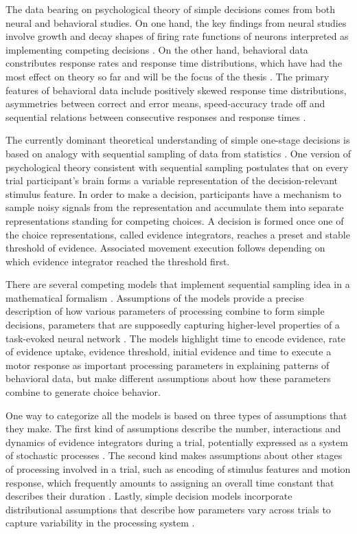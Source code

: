\documentclass[12pt]{report}
\begin{document}
The data bearing on psychological theory of simple decisions comes from both neural and behavioral studies. On one hand, the key findings from neural studies involve growth and decay shapes of firing rate functions of neurons interpreted as implementing competing decisions \citep{GolSha2007}. On the other hand, behavioral data constributes response rates and response time distributions, which have had the most effect on theory so far and will be the focus of the thesis \citep{Sto1960,Edw1965,Vic1979, TowAsh1983,Luc1986,ShaNew1996,RatRou1998,SmiRat2004,Bog2007,MulMaa2014}. The primary features of behavioral data include positively skewed response time distributions, asymmetries between correct and error means, speed-accuracy trade off and sequential relations between consecutive responses and response times \citep{CraPer2010,Rat2014}. 

The currently dominant theoretical understanding of simple one-stage decisions is based on analogy with sequential sampling of data from statistics \citep{WalWol1948, Sto1960,Vic1979, BogBro2006}. One version of psychological theory consistent with sequential sampling postulates that on every trial participant's brain forms a variable representation of the decision-relevant stimulus feature. In order to make a decision, participants have a mechanism to sample noisy signals from the representation and accumulate them into separate representations standing for competing choices. A decision is formed once one of the choice representations, called evidence integrators, reaches a preset and stable threshold of evidence. Associated movement execution follows depending on which evidence integrator reached the threshold first. 

There are several competing models that implement sequential sampling idea in a mathematical formalism  \citep{Sto1960,Pik1973,Rat1978,UshMcc2001,BroHea2008}. Assumptions of the models provide a precise description of how various parameters of processing combine to form simple decisions, parameters that are supposedly capturing higher-level properties of a task-evoked neural network \citep{GolSha2007,CasHea2014,MulMaa2014,ColBas2014}. The models highlight time to encode evidence, rate of evidence uptake, evidence threshold, initial evidence and time to execute a motor response as important processing parameters in explaining patterns of behavioral data, but make different assumptions about how these parameters combine to generate choice behavior. 

One way to categorize all the models is based on three types of assumptions that they make. The first kind of assumptions describe the number, interactions and dynamics of evidence integrators during a trial, potentially expressed as a system of stochastic processes \citep{Smi2000}. The second kind makes assumptions about other stages of processing involved in a trial, such as encoding of stimulus features and motion response, which frequently amounts to assigning an overall time constant that describes their duration \citep{RatSmi2004}. Lastly, simple decision models incorporate distributional assumptions that describe how parameters vary across trials to capture variability in the processing system \citep{RatSmi2004, JonDzh2014}. 
\end{document}

